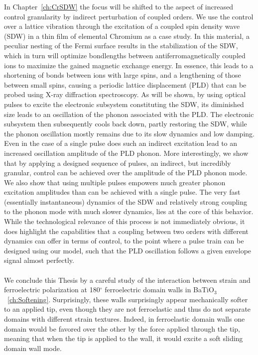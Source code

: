 In Chapter~\ref{ch:CrSDW} the focus will be shifted to the aspect of increased control granularity by indirect perturbation of coupled orders.
We use the control over a lattice vibration through the excitation of a coupled spin density wave (SDW) in a thin film of elemental Chromium as a case study.
In this material, a peculiar nesting of the Fermi surface results in the stabilization of the SDW, which in turn will optimize bondlengths between antiferromagnetically coupled ions to maximize the gained magnetic exchange energy.
In essence, this leads to a shortening of bonds between ions with large spins, and a lengthening of those between small spins, causing a periodic lattice displacement (PLD) that can be probed using X-ray diffraction spectroscopy.
As will be shown, by using optical pulses to excite the electronic subsystem constituting the SDW, its diminished size leads to an oscillation of the phonon associated with the PLD.
The electronic subsystem then subsequently cools back down, partly restoring the SDW, while the phonon oscillation mostly remains due to its slow dynamics and low damping.
Even in the case of a single pulse does such an indirect excitation lead to an increased oscillation amplitude of the PLD phonon.
More interestingly, we show that by applying a designed sequence of pulses, an indirect, but incredibly granular, control can be achieved over the amplitude of the PLD phonon mode.
We also show that using multiple pulses empowers much greater phonon excitation amplitudes than can be achieved with a single pulse.
The very fast (essentially instantaneous) dynamics of the SDW and relatively strong coupling to the phonon mode with much slower dynamics, lies at the core of this behavior.
While the technological relevance of this process is not immediately obvious, it does highlight the capabilities that a coupling between two orders with different dynamics can offer in terms of control, to the point where a pulse train can be designed using our model, such that the PLD oscillation follows a given envelope signal almost perfectly.
\\\\
We conclude this Thesis by a careful study of the interaction between strain and ferroelectric polarization at 180$^\circ$ ferroelectric domain walls in BaTiO$_3$~\ref{ch:Softening}.
Surprisingly, these walls surprisingly appear mechanically softer to an applied tip, even though they are not ferroelastic and thus do not separate domains with different strain textures.
Indeed, in ferroelastic domain walls one domain would be favored over the other by the force applied through the tip, meaning that when the tip is applied to the wall, it would excite a soft sliding domain wall mode.

